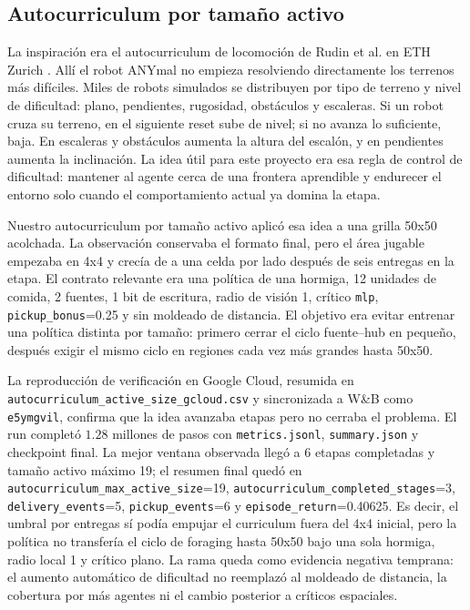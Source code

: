 \documentclass[11pt,a4paper]{article}
\newcommand{\run}[1]{\nolinkurl{#1}}
\newcommand{\metric}[1]{\nolinkurl{#1}}
\begin{document}
\subsection{Autocurriculum por tamaño activo}

La inspiración era el autocurriculum de locomoción de Rudin et al. en ETH Zurich \cite{rudin2022learning}. Allí el robot ANYmal no empieza resolviendo directamente los terrenos más difíciles. Miles de robots simulados se distribuyen por tipo de terreno y nivel de dificultad: plano, pendientes, rugosidad, obstáculos y escaleras. Si un robot cruza su terreno, en el siguiente reset sube de nivel; si no avanza lo suficiente, baja. En escaleras y obstáculos aumenta la altura del escalón, y en pendientes aumenta la inclinación. La idea útil para este proyecto era esa regla de control de dificultad: mantener al agente cerca de una frontera aprendible y endurecer el entorno solo cuando el comportamiento actual ya domina la etapa.

Nuestro autocurriculum por tamaño activo aplicó esa idea a una grilla 50x50 acolchada. La observación conservaba el formato final, pero el área jugable empezaba en 4x4 y crecía de a una celda por lado después de seis entregas en la etapa. El contrato relevante era una política de una hormiga, 12 unidades de comida, 2 fuentes, 1 bit de escritura, radio de visión 1, crítico \run{mlp}, \metric{pickup_bonus}=0.25 y sin moldeado de distancia. El objetivo era evitar entrenar una política distinta por tamaño: primero cerrar el ciclo fuente--hub en pequeño, después exigir el mismo ciclo en regiones cada vez más grandes hasta 50x50.

La reproducción de verificación en Google Cloud, resumida en \run{autocurriculum_active_size_gcloud.csv} y sincronizada a W\&B como \run{e5ymgvil}, confirma que la idea avanzaba etapas pero no cerraba el problema. El run completó \(1.28\) millones de pasos con \run{metrics.jsonl}, \run{summary.json} y checkpoint final. La mejor ventana observada llegó a 6 etapas completadas y tamaño activo máximo 19; el resumen final quedó en \metric{autocurriculum_max_active_size}=19, \metric{autocurriculum_completed_stages}=3, \metric{delivery_events}=5, \metric{pickup_events}=6 y \metric{episode_return}=0.40625. Es decir, el umbral por entregas sí podía empujar el curriculum fuera del 4x4 inicial, pero la política no transfería el ciclo de foraging hasta 50x50 bajo una sola hormiga, radio local 1 y crítico plano. La rama queda como evidencia negativa temprana: el aumento automático de dificultad no reemplazó al moldeado de distancia, la cobertura por más agentes ni el cambio posterior a críticos espaciales.
\end{document}
